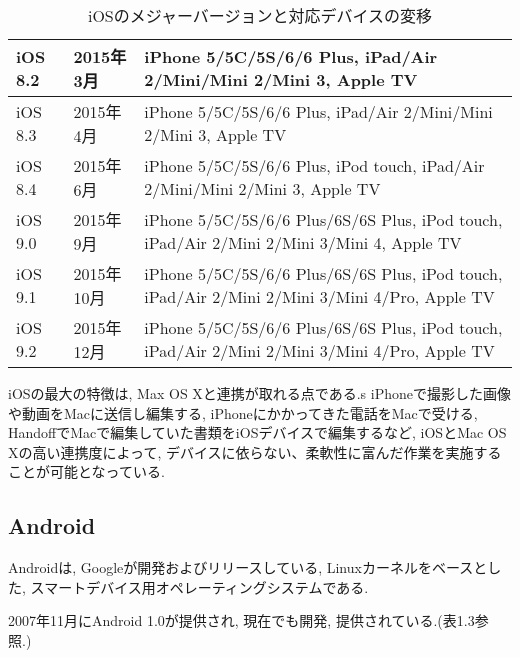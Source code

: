 \begin{table}[htb]
\begin{center}
\begin{tabular}{|l|l|p{10cm}|}
iOS 8.2 & 2015年3月 & iPhone 5/5C/5S/6/6 Plus, iPad/Air 2/Mini/Mini 2/Mini 3, Apple TV \\ \hline
iOS 8.3 & 2015年4月 & iPhone 5/5C/5S/6/6 Plus, iPad/Air 2/Mini/Mini 2/Mini 3, Apple TV \\ \hline
iOS 8.4 & 2015年6月 & iPhone 5/5C/5S/6/6 Plus, iPod touch, iPad/Air 2/Mini/Mini 2/Mini 3, Apple TV \\ \hline
iOS 9.0 & 2015年9月 & iPhone 5/5C/5S/6/6 Plus/6S/6S Plus, iPod touch, iPad/Air 2/Mini 2/Mini 3/Mini 4, Apple TV \\ \hline
iOS 9.1 & 2015年10月 & iPhone 5/5C/5S/6/6 Plus/6S/6S Plus, iPod touch, iPad/Air 2/Mini 2/Mini 3/Mini 4/Pro, Apple TV \\ \hline
iOS 9.2 & 2015年12月 & iPhone 5/5C/5S/6/6 Plus/6S/6S Plus, iPod touch, iPad/Air 2/Mini 2/Mini 3/Mini 4/Pro, Apple TV \\ \hline
\end{tabular}
\caption{iOSのメジャーバージョンと対応デバイスの変移}
\end{center}
\end{table}

iOSの最大の特徴は, Max OS Xと連携が取れる点である.s
iPhoneで撮影した画像や動画をMacに送信し編集する, iPhoneにかかってきた電話をMacで受ける, HandoffでMacで編集していた書類をiOSデバイスで編集するなど, iOSとMac OS Xの高い連携度によって, デバイスに依らない、柔軟性に富んだ作業を実施することが可能となっている.

\subsection{Android}
Androidは, Googleが開発およびリリースしている, Linuxカーネルをベースとした, スマートデバイス用オペレーティングシステムである.

2007年11月にAndroid 1.0が提供され, 現在でも開発, 提供されている.(表1.3参照.)

